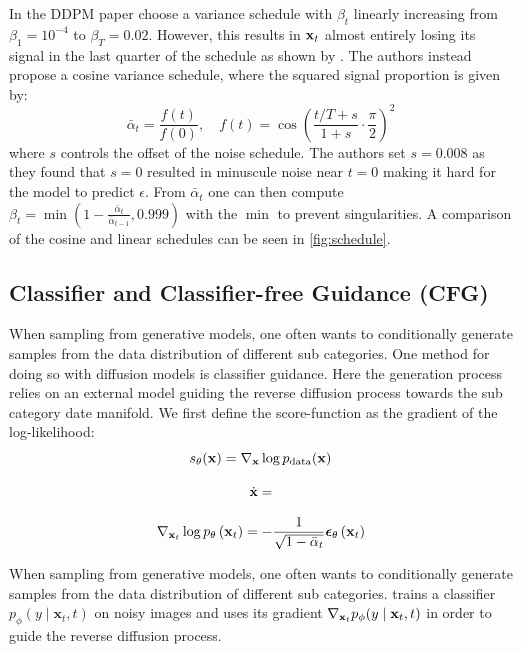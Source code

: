 In the DDPM paper \cite{ho2020denoising} choose a variance schedule with $\beta_t$ linearly increasing from $\beta_1 = 10^{-4}$ to $\beta_T = 0.02$. However, this results in $\boldsymbol{\mathbf{x}}_t$ almost entirely losing its signal in the last quarter of the schedule as shown by \cite{pmlrv139nichol21a}. The authors instead propose a cosine variance schedule, where the squared signal proportion is given by:
\begin{equation}
    \bar{\alpha}_t=\frac{f(t)}{f(0)}, \quad f(t)=\cos \left(\frac{t / T+s}{1+s} \cdot \frac{\pi}{2}\right)^2
\end{equation}
where $s$ controls the offset of the noise schedule. The authors set $s=0.008$ as they found that $s=0$ resulted in minuscule noise near $t=0$ making it hard for the model to predict $\epsilon$. From $\bar{\alpha}_t$ one can then compute $\beta_t = \min\left( 1 - \frac{\bar{\alpha}_t}{\bar{\alpha}_{t-1}}, 0.999 \right)$ with the $\min$ to prevent singularities. A comparison of the cosine and linear schedules can be seen in \cref{fig:schedule}.


\subsection{Classifier and Classifier-free Guidance (CFG)}
When sampling from generative models, one often wants to conditionally generate samples from the data distribution of different sub categories. One method for doing so with diffusion models is classifier guidance. Here the generation process relies on an external model guiding the reverse diffusion process towards the sub category date manifold. We first define the score-function as the gradient of the log-likelihood:
\begin{equation}
    s_\theta(\boldsymbol{\mathbf{x}}) = \nabla_{\boldsymbol{\mathbf{x}}} \log p_\text{data}(\boldsymbol{\mathbf{x}})
\end{equation}

\begin{equation}
    \dot{\boldsymbol{\mathbf{x}}} = 
\end{equation}

\begin{equation}
    \nabla_{\boldsymbol{\mathbf{x}}_t} \log p_\theta\left(\boldsymbol{\mathbf{x}}_t\right)=-\frac{1}{\sqrt{1-\bar{\alpha}_t}} \boldsymbol{\mathbf{\epsilon}}_\theta\left(\boldsymbol{\mathbf{x}}_t\right)
\end{equation}

\cite{dharial2021diffusion}

When sampling from generative models, one often wants to conditionally generate samples from the data distribution of different sub categories. \cite{dharial2021diffusion} trains a classifier $p_\phi(y \mid \mathbf{x}_t, t)$ on noisy images and uses its gradient $\nabla_{\boldsymbol{\mathbf{x}}_t} p_\phi(y \mid \mathbf{x}_t, t)$ in order to guide the reverse diffusion process.





